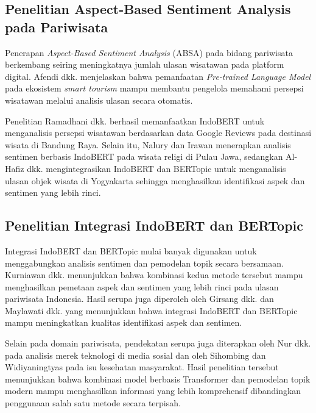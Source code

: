 \subsection{Penelitian Aspect-Based Sentiment Analysis pada Pariwisata}

Penerapan \textit{Aspect-Based Sentiment Analysis} (ABSA) pada bidang pariwisata berkembang seiring meningkatnya jumlah ulasan wisatawan pada platform digital. Afendi dkk. \cite{afendi2023} menjelaskan bahwa pemanfaatan \textit{Pre-trained Language Model} pada ekosistem \textit{smart tourism} mampu membantu pengelola memahami persepsi wisatawan melalui analisis ulasan secara otomatis.

Penelitian Ramadhani dkk. \cite{ramadhani2024} berhasil memanfaatkan IndoBERT untuk menganalisis persepsi wisatawan berdasarkan data Google Reviews pada destinasi wisata di Bandung Raya. Selain itu, Nalury dan Irawan \cite{nalury2024} menerapkan analisis sentimen berbasis IndoBERT pada wisata religi di Pulau Jawa, sedangkan Al-Hafiz dkk. \cite{alhafiz2024} mengintegrasikan IndoBERT dan BERTopic untuk menganalisis ulasan objek wisata di Yogyakarta sehingga menghasilkan identifikasi aspek dan sentimen yang lebih rinci.

\subsection{Penelitian Integrasi IndoBERT dan BERTopic}

Integrasi IndoBERT dan BERTopic mulai banyak digunakan untuk menggabungkan analisis sentimen dan pemodelan topik secara bersamaan. Kurniawan dkk. \cite{kurniawan2023} menunjukkan bahwa kombinasi kedua metode tersebut mampu menghasilkan pemetaan aspek dan sentimen yang lebih rinci pada ulasan pariwisata Indonesia. Hasil serupa juga diperoleh oleh Girsang dkk. \cite{girsang2024} dan Maylawati dkk. \cite{maylawati2024} yang menunjukkan bahwa integrasi IndoBERT dan BERTopic mampu meningkatkan kualitas identifikasi aspek dan sentimen.

Selain pada domain pariwisata, pendekatan serupa juga diterapkan oleh Nur dkk. \cite{nur2025} pada analisis merek teknologi di media sosial dan oleh Sihombing dan Widiyaningtyas \cite{sihombing2025} pada isu kesehatan masyarakat. Hasil penelitian tersebut menunjukkan bahwa kombinasi model berbasis Transformer dan pemodelan topik modern mampu menghasilkan informasi yang lebih komprehensif dibandingkan penggunaan salah satu metode secara terpisah.
